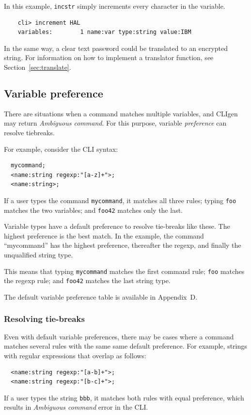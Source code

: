 \documentclass[a4paper, 10pt] {article}
\begin{document}
In this example, {\tt incstr} simply increments every character in the variable.
\begin{verbatim}
    cli> increment HAL
    variables:        1 name:var type:string value:IBM
\end{verbatim}

In the same way, a clear text password could be translated to an encrypted string.
For information on how to implement a translator function, see Section~\ref{sec:translate}.


\subsection{Variable preference}

There are situations when a command matches multiple variables, and CLIgen may return {\em Ambiguous command}. For this purpose, variable {\em preference} can resolve
tiebreaks.

For example, consider the CLI syntax:
\begin{verbatim}
  mycommand;
  <name:string regexp:"[a-z]+">;
  <name:string>;
\end{verbatim}

If a user types the command {\tt mycommand}, it matches all three rules; typing {\tt foo}
matches the two variables; and {\tt foo42} matches only the last.

Variable types have a default preference to resolve tie-breaks like
these. The highest preference is the best match. In the example, the
command ``mycommand'' has the highest preference, thereafter the
regexp, and finally the unqualified string type.

This means that typing {\tt mycommand} matches the first command rule; {\tt foo}
matches the regexp rule; and {\tt foo42} matches the last string type.

The default variable preference table is available in Appendix~D.

\subsubsection{Resolving tie-breaks}

Even with default variable preferences, there may be cases where a
command matches several rules with the same same default
preference. For example, strings with regular expressions that overlap
as follows:
\begin{verbatim}
  <name:string regexp:"[a-b]+">;
  <name:string regexp:"[b-c]+">;
\end{verbatim}
If a user types the string {\tt bbb}, it matches both rules with equal preference, which results in {\em Ambiguous command} error in the CLI.
\end{document}
